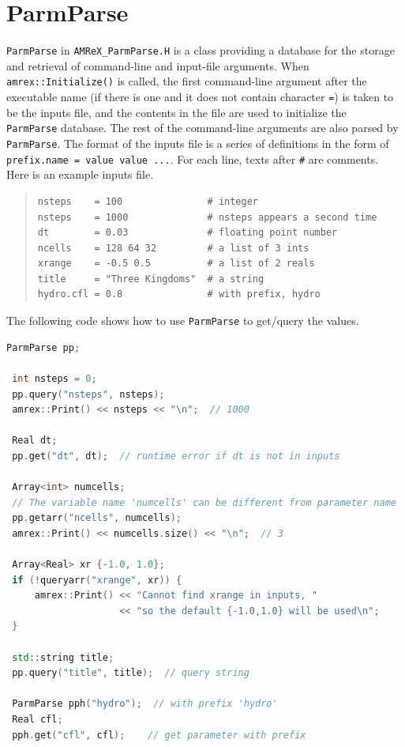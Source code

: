 \section{ParmParse}
\label{sec:basics:parmparse}

{\tt ParmParse} in {\tt AMReX\_ParmParse.H} is a class providing a
database for the storage and retrieval of command-line and input-file
arguments.  When {\tt amrex::Initialize()} is called, the first
command-line argument after the executable name (if there is one and
it does not contain character {\tt =}) is taken to be the inputs file,
and the contents in the file are used to initialize the {\tt
  ParmParse} database.  The rest of the command-line arguments are
also parsed by {\tt ParmParse}.  The format of the inputs file is a
series of definitions in the form of {\tt prefix.name = value value
  ...}.  For each line, texts after {\tt \#} are comments.  Here is an
example inputs file.
\begin{quote}
\begin{verbatim}
nsteps    = 100               # integer
nsteps    = 1000              # nsteps appears a second time
dt        = 0.03              # floating point number
ncells    = 128 64 32         # a list of 3 ints
xrange    = -0.5 0.5          # a list of 2 reals
title     = "Three Kingdoms"  # a string
hydro.cfl = 0.8               # with prefix, hydro 
\end{verbatim}
\end{quote}
The following code shows how to use {\tt ParmParse} to get/query the values.
\begin{lstlisting}[language=cpp]
 ParmParse pp;
 
 int nsteps = 0;
 pp.query("nsteps", nsteps);
 amrex::Print() << nsteps << "\n";  // 1000
 
 Real dt;
 pp.get("dt", dt);  // runtime error if dt is not in inputs
 
 Array<int> numcells;
 // The variable name 'numcells' can be different from parameter name 'ncells'.
 pp.getarr("ncells", numcells);
 amrex::Print() << numcells.size() << "\n";  // 3
 
 Array<Real> xr {-1.0, 1.0};
 if (!queryarr("xrange", xr)) {
     amrex::Print() << "Cannot find xrange in inputs, "
                    << "so the default {-1.0,1.0} will be used\n";
 }
 
 std::string title;
 pp.query("title", title);  // query string
 
 ParmParse pph("hydro");  // with prefix 'hydro'
 Real cfl;
 pph.get("cfl", cfl);    // get parameter with prefix
\end{lstlisting}
